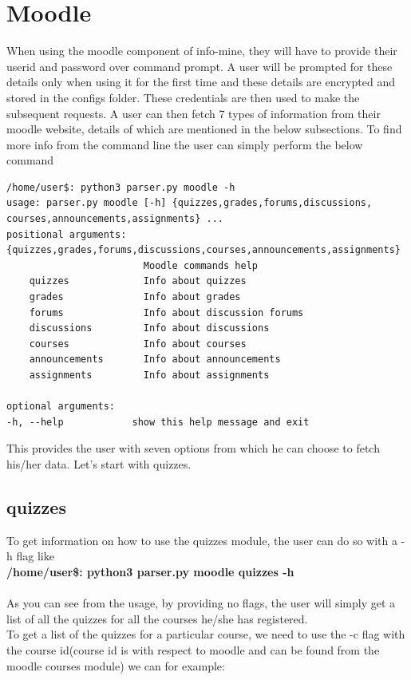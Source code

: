 \documentclass[12pt, letterpaper, twoside]{article}
\begin{document}
\section{Moodle}
When using the moodle component of info-mine, they will have to provide their userid and password over command prompt.
A user will be prompted for these details only when using it for the first time and these details are encrypted and stored in the configs
folder. 
These credentials are then used to make the subsequent requests.
A user can then fetch 7 types of information from their moodle website, details of which are mentioned in the below subsections.
To find more info from the command line the user can simply perform the below command
\begin{verbatim}
/home/user$: python3 parser.py moodle -h
usage: parser.py moodle [-h] {quizzes,grades,forums,discussions,
courses,announcements,assignments} ...
positional arguments:
{quizzes,grades,forums,discussions,courses,announcements,assignments}
                        Moodle commands help
    quizzes             Info about quizzes
    grades              Info about grades
    forums              Info about discussion forums
    discussions         Info about discussions
    courses             Info about courses
    announcements       Info about announcements
    assignments         Info about assignments

optional arguments:
-h, --help            show this help message and exit

\end{verbatim}
    This provides the user with seven options from which he can choose to fetch his/her data.
    Let's start with quizzes.
\subsection{quizzes}
To get information on how to use the quizzes module, the user can do so with a -h flag like \\
\textbf{/home/user\$: python3 parser.py moodle quizzes -h}\\
\\
As you can see from the usage, by providing no flags, the user will simply get a list of all the quizzes for all the courses he/she has registered.\\
To get a list of the quizzes for a particular course, we need to use the -c flag with the course id(course id is with respect to moodle and can be found from the moodle courses module) we can for example:
\end{document}
